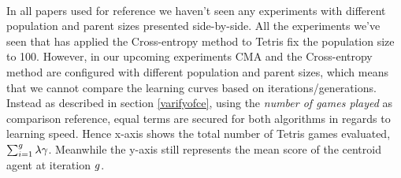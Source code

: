 \\
In all papers used for reference we haven't seen any experiments with different population
and parent sizes presented side-by-side. All the experiments we've seen
that has applied the Cross-entropy method to Tetris fix the population size to 100. 
However, in our upcoming experiments
CMA and the Cross-entropy method are configured with different population and parent sizes, which means
that we cannot compare the learning curves based on iterations/generations. Instead as described
in section \ref{varifyofce}, using the  
\textit{number of games played} as comparison reference, equal terms are secured for both algorithms 
in regards to learning speed.
Hence x-axis shows the total number 
of Tetris games evaluated, 
$\sum_{i = 1}^{g} \lambda \gamma$. 
Meanwhile the y-axis still represents the mean score 
of the centroid agent at iteration $g$.\\














